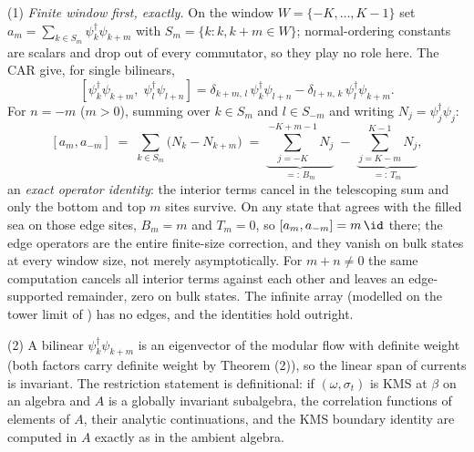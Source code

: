 (1) \emph{Finite window first, exactly.} On the window $W = \{-K, \dots, K-1\}$ set $a_m = \sum_{k \in S_m} \psi^\dagger_k \psi_{k+m}$ with $S_m = \{k : k, k+m \in W\}$; normal-ordering constants are scalars and drop out of every commutator, so they play no role here. The CAR give, for single bilinears,
\[
[\psi^\dagger_k \psi_{k+m},\; \psi^\dagger_l \psi_{l+n}] = \delta_{k+m,\,l}\,\psi^\dagger_k\psi_{l+n} - \delta_{l+n,\,k}\,\psi^\dagger_l\psi_{k+m} .
\]
For $n = -m$ ($m > 0$), summing over $k \in S_m$ and $l \in S_{-m}$ and writing $N_j = \psi^\dagger_j\psi_j$:
\[
[a_m, a_{-m}] \;=\; \sum_{k \in S_m} \bigl(N_k - N_{k+m}\bigr)
\;=\; \underbrace{\sum_{j=-K}^{-K+m-1} N_j}_{=:\,B_m} \;-\; \underbrace{\sum_{j=K-m}^{K-1} N_j}_{=:\,T_m} ,
\]
an \emph{exact operator identity}: the interior terms cancel in the telescoping sum and only the bottom and top $m$ sites survive. On any state that agrees with the filled sea on those edge sites, $B_m = m$ and $T_m = 0$, so $[a_m, a_{-m}] = m\,\id$ there; the edge operators are the entire finite-size correction, and they vanish on bulk states at every window size, not merely asymptotically. For $m + n \neq 0$ the same computation cancels all interior terms against each other and leaves an edge-supported remainder, zero on bulk states. The infinite array (modelled on the tower limit of \cite[Thm.~5.6]{ButlerT3}) has no edges, and the identities hold outright.

(2) A bilinear $\psi^\dagger_k\psi_{k+m}$ is an eigenvector of the modular flow with definite weight (both factors carry definite weight by Theorem (2)), so the linear span of currents is invariant. The restriction statement is definitional: if $(\omega, \sigma_t)$ is KMS at $\beta$ on an algebra and $A$ is a globally invariant subalgebra, the correlation functions of elements of $A$, their analytic continuations, and the KMS boundary identity are computed in $A$ exactly as in the ambient algebra.

